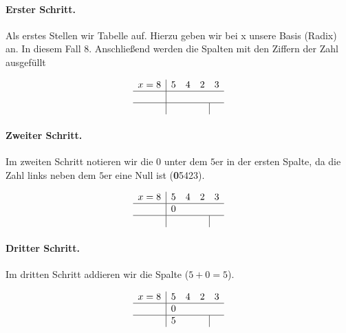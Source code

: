 \documentclass{article}
\begin{document}
\paragraph{Erster Schritt.}

Als erstes Stellen wir Tabelle auf. Hierzu geben wir bei x unsere Basis (Radix) an. In diesem Fall $8$.
Anschließend werden die Spalten mit den Ziffern der Zahl ausgefüllt

\begin{align*}
    \begin{array}{c|cccc}
        x=8 & 5 & 4 & 2                     & 3 \\ \hline
            &   &   &                       &   \\ \hline
            &   &   & \multicolumn{1}{c|}{} &
    \end{array}
\end{align*}


\paragraph{Zweiter Schritt.}

Im zweiten Schritt notieren wir die $0$ unter dem $5$er in der ersten Spalte, da die Zahl links neben dem $5$er eine Null ist (\textbf{0}5423).


\begin{align*}
    \begin{array}{c|cccc}
        x=8 & 5 & 4 & 2                     & 3 \\ \hline
            & 0 &   &                       &   \\ \hline
            &   &   & \multicolumn{1}{c|}{} &
    \end{array}
\end{align*}

\paragraph{Dritter Schritt.}

Im dritten Schritt addieren wir die Spalte ($5+0=5$).

\begin{align*}
    \begin{array}{c|cccc}
        x=8 & 5 & 4 & 2                     & 3 \\ \hline
            & 0 &   &                       &   \\ \hline
            & 5 &   & \multicolumn{1}{c|}{} &
    \end{array}
\end{align*}
\end{document}
